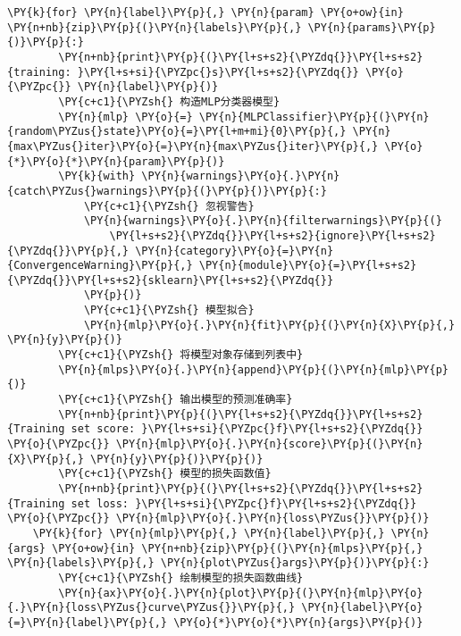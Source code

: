\begin{Verbatim}[commandchars=\\\{\}]
    \PY{k}{for} \PY{n}{label}\PY{p}{,} \PY{n}{param} \PY{o+ow}{in} \PY{n+nb}{zip}\PY{p}{(}\PY{n}{labels}\PY{p}{,} \PY{n}{params}\PY{p}{)}\PY{p}{:}
        \PY{n+nb}{print}\PY{p}{(}\PY{l+s+s2}{\PYZdq{}}\PY{l+s+s2}{training: }\PY{l+s+si}{\PYZpc{}s}\PY{l+s+s2}{\PYZdq{}} \PY{o}{\PYZpc{}} \PY{n}{label}\PY{p}{)}
        \PY{c+c1}{\PYZsh{} 构造MLP分类器模型}
        \PY{n}{mlp} \PY{o}{=} \PY{n}{MLPClassifier}\PY{p}{(}\PY{n}{random\PYZus{}state}\PY{o}{=}\PY{l+m+mi}{0}\PY{p}{,} \PY{n}{max\PYZus{}iter}\PY{o}{=}\PY{n}{max\PYZus{}iter}\PY{p}{,} \PY{o}{*}\PY{o}{*}\PY{n}{param}\PY{p}{)}
        \PY{k}{with} \PY{n}{warnings}\PY{o}{.}\PY{n}{catch\PYZus{}warnings}\PY{p}{(}\PY{p}{)}\PY{p}{:}
            \PY{c+c1}{\PYZsh{} 忽视警告}
            \PY{n}{warnings}\PY{o}{.}\PY{n}{filterwarnings}\PY{p}{(}
                \PY{l+s+s2}{\PYZdq{}}\PY{l+s+s2}{ignore}\PY{l+s+s2}{\PYZdq{}}\PY{p}{,} \PY{n}{category}\PY{o}{=}\PY{n}{ConvergenceWarning}\PY{p}{,} \PY{n}{module}\PY{o}{=}\PY{l+s+s2}{\PYZdq{}}\PY{l+s+s2}{sklearn}\PY{l+s+s2}{\PYZdq{}}
            \PY{p}{)}
            \PY{c+c1}{\PYZsh{} 模型拟合}
            \PY{n}{mlp}\PY{o}{.}\PY{n}{fit}\PY{p}{(}\PY{n}{X}\PY{p}{,} \PY{n}{y}\PY{p}{)}
        \PY{c+c1}{\PYZsh{} 将模型对象存储到列表中}
        \PY{n}{mlps}\PY{o}{.}\PY{n}{append}\PY{p}{(}\PY{n}{mlp}\PY{p}{)}
        \PY{c+c1}{\PYZsh{} 输出模型的预测准确率}
        \PY{n+nb}{print}\PY{p}{(}\PY{l+s+s2}{\PYZdq{}}\PY{l+s+s2}{Training set score: }\PY{l+s+si}{\PYZpc{}f}\PY{l+s+s2}{\PYZdq{}} \PY{o}{\PYZpc{}} \PY{n}{mlp}\PY{o}{.}\PY{n}{score}\PY{p}{(}\PY{n}{X}\PY{p}{,} \PY{n}{y}\PY{p}{)}\PY{p}{)}
        \PY{c+c1}{\PYZsh{} 模型的损失函数值}
        \PY{n+nb}{print}\PY{p}{(}\PY{l+s+s2}{\PYZdq{}}\PY{l+s+s2}{Training set loss: }\PY{l+s+si}{\PYZpc{}f}\PY{l+s+s2}{\PYZdq{}} \PY{o}{\PYZpc{}} \PY{n}{mlp}\PY{o}{.}\PY{n}{loss\PYZus{}}\PY{p}{)}
    \PY{k}{for} \PY{n}{mlp}\PY{p}{,} \PY{n}{label}\PY{p}{,} \PY{n}{args} \PY{o+ow}{in} \PY{n+nb}{zip}\PY{p}{(}\PY{n}{mlps}\PY{p}{,} \PY{n}{labels}\PY{p}{,} \PY{n}{plot\PYZus{}args}\PY{p}{)}\PY{p}{:}
        \PY{c+c1}{\PYZsh{} 绘制模型的损失函数曲线}
        \PY{n}{ax}\PY{o}{.}\PY{n}{plot}\PY{p}{(}\PY{n}{mlp}\PY{o}{.}\PY{n}{loss\PYZus{}curve\PYZus{}}\PY{p}{,} \PY{n}{label}\PY{o}{=}\PY{n}{label}\PY{p}{,} \PY{o}{*}\PY{o}{*}\PY{n}{args}\PY{p}{)}


\end{Verbatim}
